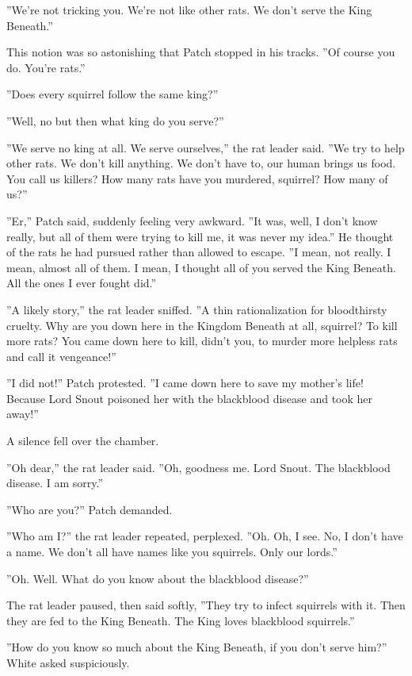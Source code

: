 \documentclass[11pt]{article}
\begin{document}
 ''We're not tricking you. We're not like other rats. We don't serve the King Beneath.''\par
 This notion was so astonishing that Patch stopped in his tracks. ''Of course you do. You're rats.''\par
 ''Does every squirrel follow the same king?''\par
 ''Well, no %
 but %
 then what king do you serve?''\par
 ''We serve no king at all. We serve ourselves,'' the rat leader said. ''We try to help other rats. We don't kill anything. We don't have to, our human brings us food. You call us killers? How many rats have you murdered, squirrel? How many of us?''\par
 ''Er,'' Patch said, suddenly feeling very awkward. ''It was, well, I don't know really, but all of them were trying to kill me, it was never my idea.'' He thought of the rats he had pursued rather than allowed to escape. ''I mean, not really. I mean, almost all of them. I mean, I thought all of you served the King Beneath. All the ones I ever fought did.''\par
 ''A likely story,'' the rat leader sniffed. ''A thin rationalization for bloodthirsty cruelty. Why are you down here in the Kingdom Beneath at all, squirrel? To kill more rats? You came down here to kill, didn't you, to murder more helpless rats and call it vengeance!''\par
 ''I did not!'' Patch protested. ''I came down here to save my mother's life! Because Lord Snout poisoned her with the blackblood disease and took her away!''\par
 A silence fell over the chamber.\par
 ''Oh dear,'' the rat leader said. ''Oh, goodness me. Lord Snout. The blackblood disease. I am sorry.''\par
 ''Who are you?'' Patch demanded.\par
 ''Who am I?'' the rat leader repeated, perplexed. ''Oh. Oh, I see. No, I don't have a name. We don't all have names like you squirrels. Only our lords.''\par
 ''Oh. Well. What do you know about the blackblood disease?''\par
 The rat leader paused, then said softly, ''They try to infect squirrels with it. Then they are fed to the King Beneath. The King loves blackblood squirrels.''\par
 ''How do you know so much about the King Beneath, if you don't serve him?'' White asked suspiciously.\par
\end{document}
